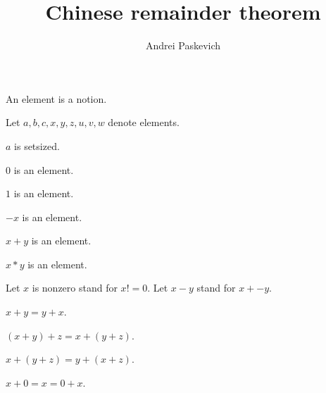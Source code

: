 \documentclass{article}
\title{Chinese remainder theorem}
\author{Andrei Paskevich}
\date{}
\begin{document}

  \maketitle

  \begin{forthel}

    \begin{signature}[ElmSort]
      An element is a notion.
    \end{signature}

    Let $a,b,c,x,y,z,u,v,w$ denote elements.

    \begin{axiom}
      $a$ is setsized.
    \end{axiom}

    \begin{signature}[SortsC]
      $0$ is an element.
    \end{signature}

    \begin{signature}[SortsC]
      $1$ is an element.
    \end{signature}

    \begin{signature}[Sortsu]
      $-x$ is an element.
    \end{signature}

    \begin{signature}[SortsB]
      $x + y$ is an element.
    \end{signature}

    \begin{signature}[SortsB]
      $x * y$ is an element.
    \end{signature}

    Let $x$ is nonzero stand for $x != 0$.
    Let $x - y$ stand for $x + -y$.

    \begin{axiom}[AddComm]
      $x + y = y + x$.
    \end{axiom}

    \begin{axiom}[AddAsso]
      $(x + y) + z = x + (y + z)$.
    \end{axiom}

    \begin{axiom}[AddBubble]
      $x + (y + z) = y + (x + z)$.
    \end{axiom}

    \begin{axiom}[AddZero]
      $x + 0 = x = 0 + x$.
    \end{axiom}


\end{forthel}
\end{document}
